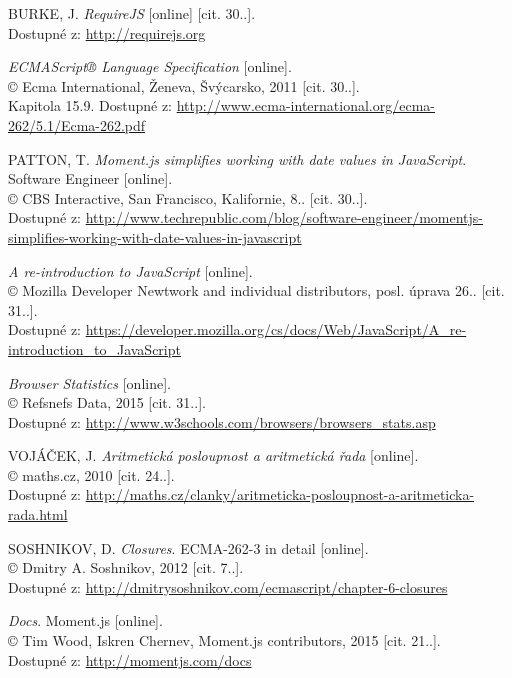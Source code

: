 \begin{flushleft}
\begin{thebibliography}{99}
			BURKE, J. {\it RequireJS} [online] [cit. 30..].\\
			Dostupné z: \url{http://requirejs.org}
			
			{\it ECMAScript® Language Specification} [online].\\
			© Ecma International, Ženeva, Švýcarsko, 2011 [cit. 30..].\\
			Kapitola 15.9. Dostupné z: \url{http://www.ecma-international.org/ecma-262/5.1/Ecma-262.pdf}
			
		\pagebreak
		
			PATTON, T. {\it Moment.js simplifies working with date values in JavaScript}. Software Engineer [online].\\
			© CBS Interactive, San Francisco, Kalifornie, 8.. [cit. 30..].\\
			Dostupné z: \url{http://www.techrepublic.com/blog/software-engineer/momentjs-simplifies-working-with-date-values-in-javascript}
			
			{\it A re-introduction to JavaScript} [online].\\
			© Mozilla Developer	Newtwork and individual distributors, posl. úprava 26.. [cit. 31..].\\
			Dostupné z: \url{https://developer.mozilla.org/cs/docs/Web/JavaScript/A_re-introduction_to_JavaScript}
			
			{\it Browser Statistics} [online].\\
			© Refsnefs Data, 2015 [cit. 31..].\\
			Dostupné z: \url{http://www.w3schools.com/browsers/browsers_stats.asp}
			
			VOJÁČEK, J. {\it Aritmetická posloupnost a aritmetická řada} [online].\\
			© maths.cz, 2010 [cit. 24..].\\
			Dostupné z: \url{http://maths.cz/clanky/aritmeticka-posloupnost-a-aritmeticka-rada.html}
			
			SOSHNIKOV, D. {\it Closures}. ECMA-262-3 in detail [online].\\
			© Dmitry A. Soshnikov, 2012 [cit. 7..].\\
			Dostupné z: \url{http://dmitrysoshnikov.com/ecmascript/chapter-6-closures}
			
			{\it Docs}. Moment.js [online].\\
			© Tim Wood, Iskren Chernev, Moment.js contributors, 2015 [cit. 21..].\\
			Dostupné z: \url{http://momentjs.com/docs}
			

\end{thebibliography}
\end{flushleft}
